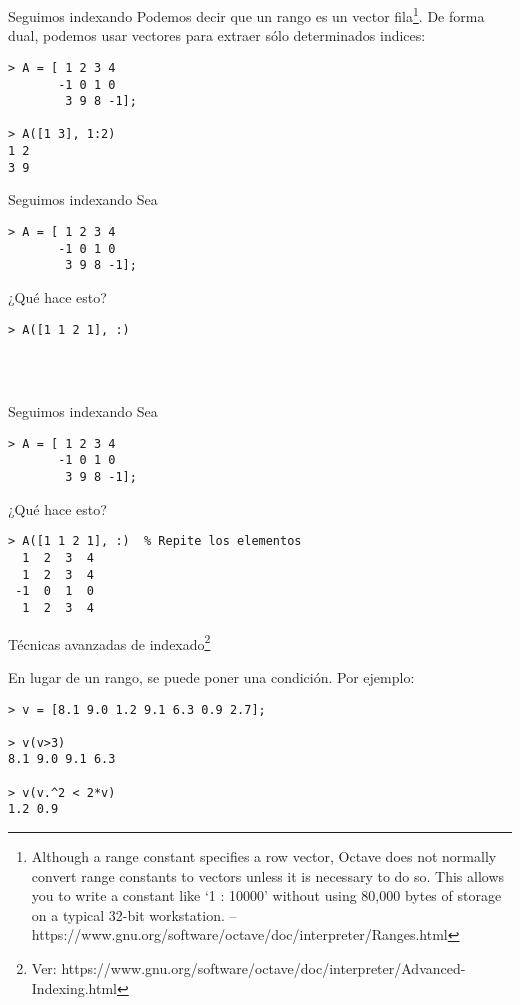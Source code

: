 \begin{frame}[fragile]{Seguimos indexando}
Podemos decir que un rango es un vector fila\footnote{Although a range constant specifies a row vector, Octave does not normally convert range constants to vectors unless it is necessary to do so. This allows you to write a constant like ‘1 : 10000’ without using 80,000 bytes of storage on a typical 32-bit workstation. --https://www.gnu.org/software/octave/doc/interpreter/Ranges.html}. De forma dual, podemos usar vectores para extraer sólo determinados indices:

\begin{lstlisting}
> A = [ 1 2 3 4
       -1 0 1 0
        3 9 8 -1];
        
> A([1 3], 1:2)
1 2
3 9
\end{lstlisting}

\end{frame}

\begin{frame}[fragile]{Seguimos indexando}
Sea 
\begin{lstlisting}
> A = [ 1 2 3 4
       -1 0 1 0
        3 9 8 -1];
\end{lstlisting}

¿Qué hace esto?
\begin{lstlisting}
> A([1 1 2 1], :)




\end{lstlisting}
\end{frame}

\begin{frame}[fragile]{Seguimos indexando}
Sea 
\begin{lstlisting}
> A = [ 1 2 3 4
       -1 0 1 0
        3 9 8 -1];
\end{lstlisting}

¿Qué hace esto?
\begin{lstlisting}
> A([1 1 2 1], :)  % Repite los elementos
  1  2  3  4
  1  2  3  4
 -1  0  1  0
  1  2  3  4 
\end{lstlisting}

\end{frame}

\begin{frame}[fragile]{Técnicas avanzadas de indexado\footnote{Ver: https://www.gnu.org/software/octave/doc/interpreter/Advanced-Indexing.html}}

En lugar de un rango, se puede poner una condición. Por ejemplo:

\begin{lstlisting}
> v = [8.1 9.0 1.2 9.1 6.3 0.9 2.7];

> v(v>3)
8.1 9.0 9.1 6.3

> v(v.^2 < 2*v)
1.2 0.9
\end{lstlisting}

\end{frame}

